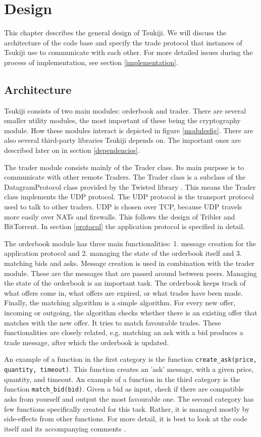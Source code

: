 \section{Design}
This chapter describes the general design of Tsukiji.
We will discuss the architecture of the code base and specify the trade protocol that instances of Tsukiji use to communicate with each other.
For more detailed issues during the process of implementation, see section \ref{implementation}.

\subsection{Architecture}
Tsukiji consists of two main modules: orderbook and trader.
There are several smaller utility modules, the most important of these being the cryptography module.
How these modules interact is depicted in figure \ref{modulesfig}.
There are also several third-party libraries Tsukiji depends on.
The important ones are described later on in section \ref{dependencies}.

The trader module consists mainly of the Trader class.
Its main purpose is to communicate with other remote Traders.
The Trader class is a subclass of the DatagramProtocol class provided by the Twisted library \cite{twisted}.
This means the Trader class implements the UDP protocol.
The UDP protocol is the transport protocol used to talk to other traders.
UDP is chosen over TCP, because UDP travels more easily over NATs and firewalls.
This follows the design of Tribler and BitTorrent.
In section \ref{protocol} the application protocol is specified in detail.

The orderbook module has three main functionalities: 1. message creation for the application protocol and 2. managing the state of the orderbook itself and 3. matching bids and asks.
Message creation is used in combination with the trader module.
These are the messages that are passed around between peers.
Managing the state of the orderbook is an important task.
The orderbook keeps track of what offers come in, what offers are expired, or what trades have been made.
Finally, the matching algorithm is a simple algorithm.
For every new offer, incoming or outgoing, the algorithm checks whether there is an existing offer that matches with the new offer.
It tries to match favourable trades.
These functionalities are closely related, e.g. matching an ask with a bid produces a trade message, after which the orderbook is updated.

An example of a function in the first category is the function \texttt{create\_ask(price, quantity, timeout)}.
This function creates an 'ask' message, with a given price, quantity, and timeout.
An example of a function in the third category is the function \texttt{match\_bid(bid)}.
Given a bid as input, check if there are compatible asks from yourself and output the most favourable one.
The second category has few functions specifically created for this task.
Rather, it is managed mostly by side-effects from other functions.
For more detail, it is best to look at the code itself and its accompanying comments \cite{tsukiji}.

